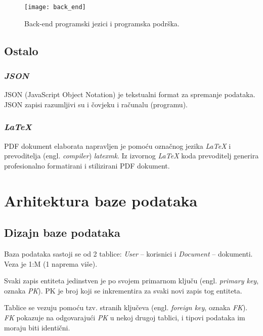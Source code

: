     \begin{figure}[h]
      \centering
      \texttt{[image: back\_end]}
      \caption{Back-end programski jezici i programska podrška.}
    \end{figure}

  \subsection{Ostalo}

    \subsubsection*{\textit{JSON}}

      JSON (JavaScript Object Notation) je tekstualni format za spremanje
      podataka. JSON zapisi razumljivi su i čovjeku i računalu (programu).

    \subsubsection*{\textit{LaTeX}}

      PDF dokument elaborata napravljen je pomoću označnog jezika \textit{LaTeX}
      i prevoditelja (engl. \textit{compiler}) \textit{latexmk}. Iz izvornog
      \textit{LaTeX} koda prevoditelj generira profesionalno formatirani i
      stilizirani PDF dokument.

\section{Arhitektura baze podataka}

  \subsection{Dizajn baze podataka}

    Baza podataka sastoji se od 2 tablice: \textit{User} -- korisnici i
    \textit{Document} -- dokumenti. Veza je 1:M (1 naprema više).

    Svaki zapis entiteta jedinstven je po svojem primarnom ključu (engl.
    \textit{primary key}, oznaka \textit{PK}). PK je broj koji se inkrementira
    za svaki novi zapis tog entiteta.

    Tablice se vezuju pomoću tzv. stranih ključeva (engl. \textit{foreign key},
    oznaka \textit{FK}). \textit{FK} pokazuje na odgovarajući \textit{PK} u
    nekoj drugoj tablici, i tipovi podataka im moraju biti identični.

